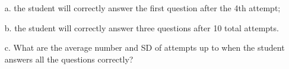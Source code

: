 \documentclass[letterpaper,12pt]{article}
\begin{document}
\begin{enumerate}
    \begin{enumerate}
      \item[a.]
        the student will correctly answer the first question after the 4th attempt;
      \item[b.]
        the student will correctly answer three questions after 10 total attempts.
      \item[c.]
        What are the average number and SD of attempts up to when the student answers all the questions correctly?
    \end{enumerate}
\end{enumerate}
\end{document}
